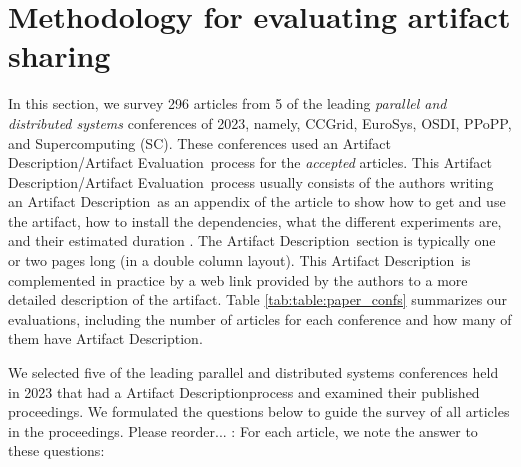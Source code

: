 \documentclass[sigconf,natbib=false]{acmart}
\newcommand{\ad}{Artifact Description}
\newcommand{\aeval}{Artifact Evaluation}
\newcommand{\adae}{\ad/\aeval}
\newcommand{\todo}[1]{{\color{red}{TODO: #1}}}
\newcommand{\fmc}[1]{{\color{magenta} #1}} %
\begin{document}
%
\section{Methodology for evaluating artifact sharing}\label{sec:methodo} %




In this section, we survey 296 articles from 5 of the leading \emph{parallel and distributed systems} conferences of 2023, namely, CCGrid, EuroSys, OSDI, PPoPP, and Supercomputing (SC).
These conferences used an \adae\ process for the \emph{accepted} articles.
This \adae\ process usually consists of the authors writing an \ad\ as an appendix of the article to show how to get and use the artifact, how to install the dependencies, what the different experiments are, and their estimated duration \cite{ae_tip, creating_successful_artifacts, ae_guidelines}.
The \ad\ section is typically one or two pages long (in a double column layout).
This \ad\ is complemented in practice by a web link provided by the authors to a more detailed description of the artifact.
Table \ref{tab:table:paper_confs} summarizes our evaluations, including the number of articles for each conference and how many of them have \ad.




We selected five of the leading parallel and distributed systems conferences held in 2023 that had a \ad process and examined their published proceedings.
We formulated the questions below to guide the survey of all articles in the proceedings. \fmc{Please reorder... }:
For each article, we note the answer to these questions: 
\end{document}
